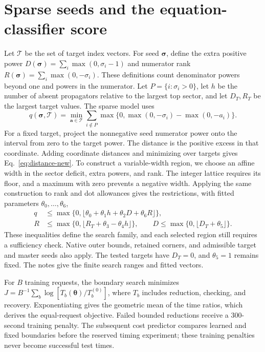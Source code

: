 \section{Sparse seeds and the equation-classifier score}
\label{app:sparse}
Let $\mathcal T$ be the set of target index vectors. For seed $\boldsymbol\sigma$, define the extra positive power $D(\boldsymbol\sigma)=\sum_i\max(0,\sigma_i-1)$ and numerator rank $R(\boldsymbol\sigma)=\sum_i\max(0,-\sigma_i)$. These definitions count denominator powers beyond one and powers in the numerator. Let $P=\{i:\sigma_i>0\}$, let $h$ be the number of absent propagators relative to the largest top sector, and let $D_T,R_T$ be the largest target values. The sparse model uses
\begin{equation}
 q(\boldsymbol\sigma,\mathcal T)=
 \min_{\boldsymbol a\in\mathcal T}\sum_{i\notin P}
 \max\{0,\max(0,-\sigma_i)-\max(0,-a_i)\}.
 \label{eq:distance-new}
\end{equation}
For a fixed target, project the nonnegative seed numerator power onto the interval from zero to the target power. The distance is the positive excess in that coordinate. Adding coordinate distances and minimizing over targets gives Eq.~\eqref{eq:distance-new}. To construct a variable-width region, we choose an affine width in the sector deficit, extra powers, and rank. The integer lattice requires its floor, and a maximum with zero prevents a negative width. Applying the same construction to rank and dot allowances gives the restrictions, with fitted parameters $\theta_0,\ldots,\theta_6$,
\begin{align}
 q&\leq\max\{0,\lfloor\theta_0+\theta_1h+\theta_2D+\theta_6R\rfloor\},\nonumber\\
 R&\leq\max\{0,\lfloor R_T+\theta_3-\theta_4h\rfloor\},\qquad
 D\leq\max\{0,\lfloor D_T+\theta_5\rfloor\}.
 \label{eq:sparse-new}
\end{align}
These inequalities define the search family, and each selected region still requires a sufficiency check. Native outer bounds, retained corners, and admissible target and master seeds also apply. The tested targets have $D_T=0$, and $\theta_5=1$ remains fixed. The notes give the finite search ranges and fitted vectors.

For $B$ training requests, the boundary search minimizes $J=B^{-1}\sum_b\log[T_b(\boldsymbol\theta)/T_b^{(0)}]$, where $T_b$ includes reduction, checking, and recovery. Exponentiating gives the geometric mean of the time ratios, which derives the equal-request objective. Failed bounded reductions receive a 300-second training penalty. The subsequent cost predictor compares learned and fixed boundaries before the reserved timing experiment; these training penalties never become successful test times.

